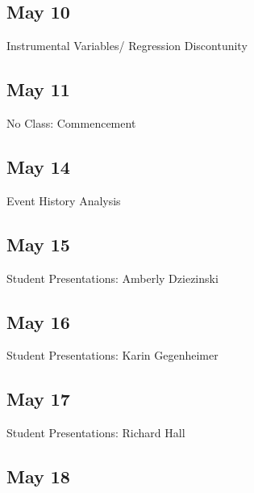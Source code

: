 \documentclass[10pt]{article}
\begin{document}
\begin{description}

\item {}
\item {}

\item {}

\item {}

\end{description}


\subsection{May 10}

Instrumental Variables/ Regression Discontunity


\subsection{May 11}
\label{sec:may-13}

No Class: Commencement

\subsection{May 14}

Event History Analysis


\subsection{May 15}

Student Presentations: Amberly Dziezinski


\subsection{May 16}

Student Presentations: Karin Gegenheimer


\subsection{May 17}

Student Presentations: Richard Hall


\subsection{May 18}
\end{document}
